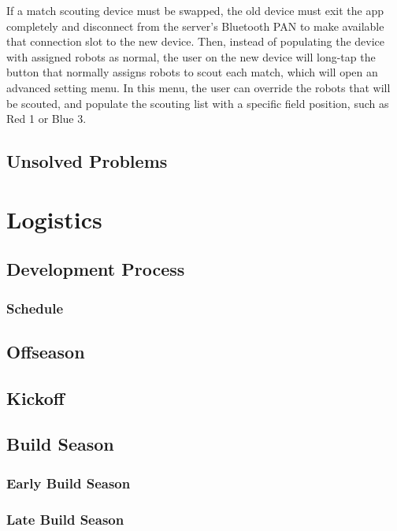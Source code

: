 \documentclass[11pt]{report}
\begin{document}
If a match scouting device must be swapped, the old device must exit the app completely and disconnect from the server's Bluetooth PAN to make available that connection slot to the new device. Then, instead of populating the device with assigned robots as normal, the user on the new device will long-tap the button that normally assigns robots to scout each match, which will open an advanced setting menu. In this menu, the user can override the robots that will be scouted, and populate the scouting list with a specific field position, such as Red 1 or Blue 3.

\section{Unsolved Problems}


\chapter{Logistics}

\section{Development Process}
\subsection{Schedule}


\section{Offseason}
\section{Kickoff}
\section{Build Season}
\subsection{Early Build Season}
\subsection{Late Build Season}
\end{document}
